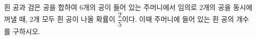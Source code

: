 흰 공과 검은 공을 합하여 $6$개의 공이 들어 있는 주머니에서 임의로 $2$개의 공을 동시에 꺼낼 때, $2$개 모두 흰 공이 나올 확률이 $\dfrac{2}{5}$이다. 이때 주머니에 들어 있는 흰 공의 개수를 구하시오.
